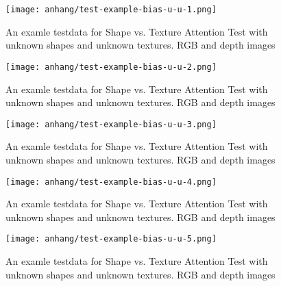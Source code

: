 	\begin{figure}[H]
		\centering
		\texttt{[image: anhang/test-example-bias-u-u-1.png]}
		\caption[An examle testdata for Shape vs. Texture Attention Test with unknown shapes and unknown textures. RGB and depth images]{An examle testdata for Shape vs. Texture Attention Test with unknown shapes and unknown textures. RGB and depth images}
	\end{figure}
	\begin{figure}[H]
		\centering
		\texttt{[image: anhang/test-example-bias-u-u-2.png]}
		\caption[An examle testdata for Shape vs. Texture Attention Test with unknown shapes and unknown textures. RGB and depth images]{An examle testdata for Shape vs. Texture Attention Test with unknown shapes and unknown textures. RGB and depth images}
	\end{figure}
	\begin{figure}[H]
		\centering
		\texttt{[image: anhang/test-example-bias-u-u-3.png]}
		\caption[An examle testdata for Shape vs. Texture Attention Test with unknown shapes and unknown textures. RGB and depth images]{An examle testdata for Shape vs. Texture Attention Test with unknown shapes and unknown textures. RGB and depth images}
	\end{figure}
	\begin{figure}[H]
		\centering
		\texttt{[image: anhang/test-example-bias-u-u-4.png]}
		\caption[An examle testdata for Shape vs. Texture Attention Test with unknown shapes and unknown textures. RGB and depth images]{An examle testdata for Shape vs. Texture Attention Test with unknown shapes and unknown textures. RGB and depth images}
	\end{figure}
	\begin{figure}[H]
		\centering
		\texttt{[image: anhang/test-example-bias-u-u-5.png]}
		\caption[An examle testdata for Shape vs. Texture Attention Test with unknown shapes and unknown textures. RGB and depth images]{An examle testdata for Shape vs. Texture Attention Test with unknown shapes and unknown textures. RGB and depth images}
	\end{figure}
	
	
	
	
	
